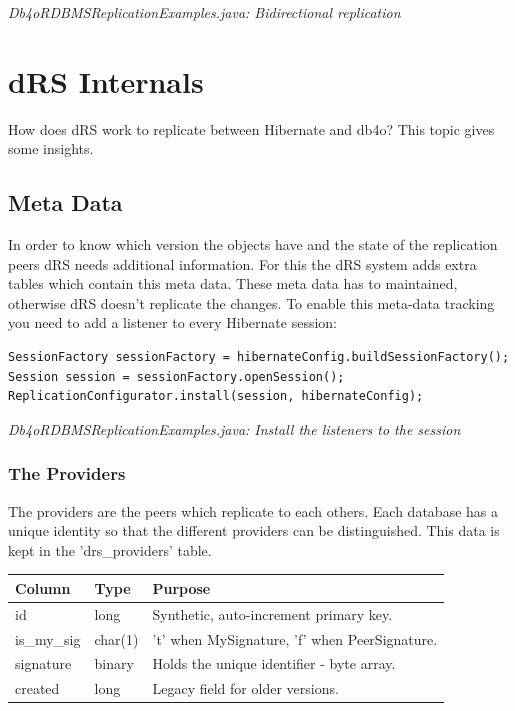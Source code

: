 {\small\itshape Db4oRDBMSReplicationExamples.java: Bidirectional replication\par}
\medskip

\section{dRS Internals}
\label{drs:db4o-replication-system-drs-db4o-rdbms-drs-internals}

How does dRS work to replicate between Hibernate and db4o? This topic gives some insights.

\subsection*{Meta Data}

In order to know which version the objects have and the state of the replication peers dRS needs additional information. For this the dRS system adds extra tables which contain this meta data. These meta data has to maintained, otherwise dRS doesn't replicate the changes. To enable this meta-data tracking you need to add a listener to every Hibernate session:

\begin{lstlisting}
SessionFactory sessionFactory = hibernateConfig.buildSessionFactory();
Session session = sessionFactory.openSession();
ReplicationConfigurator.install(session, hibernateConfig);
\end{lstlisting}

{\small\itshape Db4oRDBMSReplicationExamples.java: Install the listeners to the session\par}
\medskip

\subsubsection*{The Providers}

The providers are the peers which replicate to each others. Each database has a unique identity so that the different providers can be distinguished. This data is kept in the 'drs\_providers' table.

{\small
\begin{longtable}{|p{}|p{}|p{}|}
\hline
\textbf{Column} & \textbf{Type} & \textbf{Purpose} \\ \hline
id & long & Synthetic, auto-increment primary key. \\ \hline
is\_my\_sig & char(1) & 't' when MySignature, 'f' when PeerSignature. \\ \hline
signature & binary & Holds the unique identifier - byte array. \\ \hline
created & long & Legacy field for older versions. \\ \hline
\end{longtable}}

